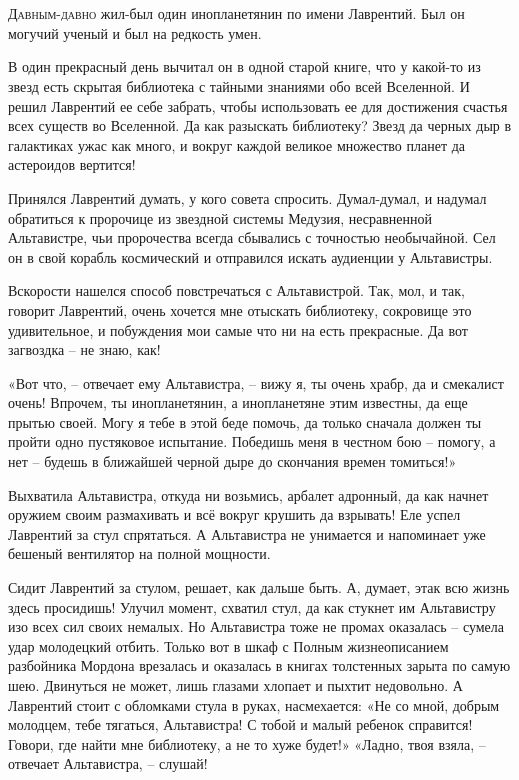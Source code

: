 \documentclass[ebook,oneside,final,openright]{memoir}
\begin{document}
\chapter{}
 \lettrine{Д}{авным-давно} жил-был один инопланетянин по имени Лаврентий. Был он могучий ученый и был на редкость умен.\par
\par
В один прекрасный день вычитал он в одной старой книге, что у какой-то из звезд есть скрытая библиотека с тайными знаниями обо всей Вселенной. И решил Лаврентий ее себе забрать, чтобы использовать ее для достижения счастья всех существ во Вселенной. Да как разыскать библиотеку? Звезд да черных дыр в галактиках ужас как много, и вокруг каждой великое множество планет да астероидов вертится!\par
\par
Принялся Лаврентий думать, у кого совета спросить. Думал-думал, и надумал обратиться к пророчице из звездной системы Медузия, несравненной Альтавистре, чьи пророчества всегда сбывались с точностью необычайной. Сел он в свой корабль космический и отправился искать аудиенции у Альтавистры.\par
\par
Вскорости нашелся способ повстречаться с Альтавистрой. Так, мол, и так, говорит Лаврентий, очень хочется мне отыскать библиотеку, сокровище это удивительное, и побуждения мои самые что ни на есть прекрасные. Да вот загвоздка – не знаю, как!\par
\par
«Вот что, – отвечает ему Альтавистра, – вижу я, ты очень храбр, да и смекалист очень! Впрочем, ты инопланетянин, а инопланетяне этим известны, да еще прытью своей. Могу я тебе в этой беде помочь, да только сначала должен ты пройти одно пустяковое испытание. Победишь меня в честном бою – помогу, а нет – будешь в ближайшей черной дыре до скончания времен томиться!» \par
\par
Выхватила Альтавистра, откуда ни возьмись, арбалет адронный, да как начнет оружием своим размахивать и всё вокруг крушить да взрывать! Еле успел Лаврентий за стул спрятаться. А Альтавистра не унимается и напоминает уже бешеный вентилятор на полной мощности. \par
\par
Сидит Лаврентий за стулом, решает, как дальше быть. А, думает, этак всю жизнь здесь просидишь! Улучил момент, схватил стул, да как стукнет им Альтавистру изо всех сил своих немалых. Но Альтавистра тоже не промах оказалась – сумела удар молодецкий отбить. Только вот в шкаф с Полным жизнеописанием разбойника Мордона врезалась и оказалась в книгах толстенных зарыта по самую шею. Двинуться не может, лишь глазами хлопает и пыхтит недовольно. А Лаврентий стоит с обломками стула в руках, насмехается: «Не со мной, добрым молодцем, тебе тягаться, Альтавистра! С тобой и малый ребенок справится! Говори, где найти мне библиотеку, а не то хуже будет!» «Ладно, твоя взяла, – отвечает Альтавистра, – слушай!\par
\end{document}
